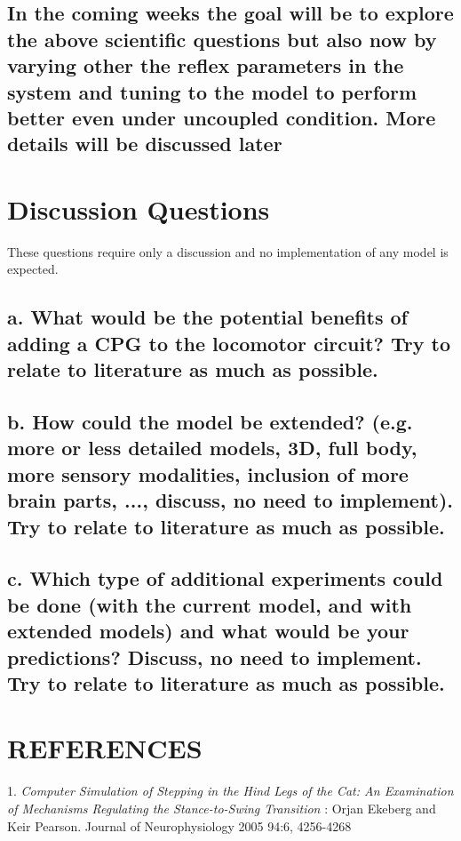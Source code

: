 \documentclass{cmc}
\begin{document}
\subsection*{In the coming weeks the goal will be to explore the above
  scientific questions but also now by varying other the reflex
  parameters in the system and tuning to the model to perform better
  even under uncoupled condition. More details will be discussed
  later}



\section*{Discussion Questions}
\label{sec:discussion-quesions}

These questions require only a discussion and no implementation of any
model is expected.

\subsection*{a. What would be the potential benefits of adding a CPG
  to the locomotor circuit? Try to relate to literature as much as
  possible.}
\label{sec:a}

\subsection*{b. How could the model be extended? (e.g. more or less
  detailed models, 3D, full body, more sensory modalities, inclusion
  of more brain parts, ..., discuss, no need to implement). Try to
  relate to literature as much as possible.}
\label{sec:b}

\subsection*{c. Which type of additional experiments could be done
  (with the current model, and with extended models) and what would be
  your predictions? Discuss, no need to implement. Try to relate to
  literature as much as possible.}
\label{sec:c}



\section*{REFERENCES}
\label{sec:references}

1. \textit{Computer Simulation of Stepping in the Hind Legs of the
  Cat: An Examination of Mechanisms Regulating the Stance-to-Swing
  Transition} : Orjan Ekeberg and Keir Pearson. Journal of
Neurophysiology 2005 94:6, 4256-4268
\href{https://www.physiology.org/doi/abs/10.1152/jn.00065.2005}{}
\end{document}
